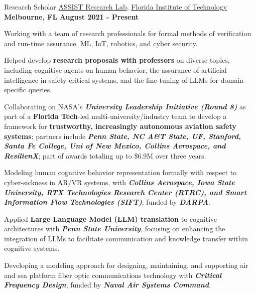 \begin{cventries}
{}
\cventry
{Research Scholar}
{\href{https://research.fit.edu/assist-lab/}{ASSIST Research Lab}, \href{https://www.fit.edu}{Florida Institute of Technology}}
{\textbf{Melbourne, FL}}
{\textbf{August 2021 - Present}}
{
\begin{cvitems}
\item Working with a team of research professionals for formal methods of verification and run-time assurance, ML, IoT, robotics, and cyber security.
\item Helped develop \textbf{research proposals with professors} on diverse topics, including cognitive agents on human behavior, the assurance of artificial intelligence in safety-critical systems, and the fine-tuning of LLMs for domain-specific queries.
\item Collaborating on NASA’s \textit{\textbf{University Leadership Initiative (Round 8)}} as part of a \textbf{Florida Tech}-led multi-university/industry team to develop a framework for \textbf{trustworthy, increasingly autonomous aviation safety systems}; partners include \textit{\textbf{Penn State, NC A\&T State, UF, Stanford, Santa Fe College, Uni of New Mexico, Collins Aerospace, and ResilienX}}; part of awards totaling up to \$6.9M over three years.
\item Modeling human cognitive behavior representation formally with respect to cyber-sickness in AR/VR systems, with \textit{\textbf{Collins Aerospace, Iowa State University, RTX Technologies Research Center (RTRC), and Smart Information Flow Technologies (SIFT)}}, funded by \textit{\textbf{DARPA}}.
\item Applied \textbf{Large Language Model (LLM) translation} to cognitive architectures with \textit{\textbf{Penn State University}}, focusing on enhancing the integration of LLMs to facilitate communication and knowledge transfer within cognitive systems.
\item Developing a modeling approach for designing, maintaining, and supporting air and sea platform fiber optic communications technology with \textit{\textbf{Critical Frequency Design}}, funded by \textit{\textbf{Naval Air Systems Command}}.

\end{cvitems}}
\end{cventries}
